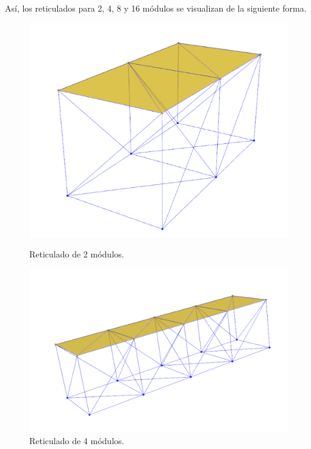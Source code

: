Así, los reticulados para 2, 4, 8 y 16 módulos se visualizan de la siguiente forma.

\begin{figure}[H]
    \begin{minipage}[b]{0.5\textwidth}
        \centering
        \includegraphics[width=\textwidth]{FOTOS/2.png}
        \caption{Reticulado de 2 módulos.}
    \end{minipage}
    \hfill
    \begin{minipage}[b]{0.5\textwidth}
        \centering
        \includegraphics[width=\textwidth]{FOTOS/4.png}
        \caption{Reticulado de 4 módulos.}
    \end{minipage}
\end{figure}

